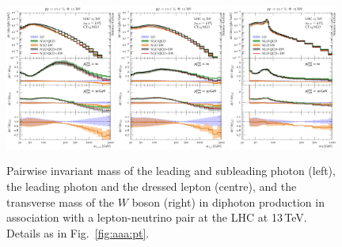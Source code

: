 \begin{figure}[t!]
  \centering
  \includegraphics[width=0.32\textwidth]{figs_aaw/m_y1y2_comb_log}
  \includegraphics[width=0.32\textwidth]{figs_aaw/m_y1l1_comb_log}
  \includegraphics[width=0.32\textwidth]{figs_aaw/m_t_comb_log}
  \caption{
    Pairwise invariant mass of the leading and subleading photon (left),
    the leading photon and the dressed lepton (centre), and the 
    transverse mass of the $W$ boson (right)
    in diphoton production in association with a lepton-neutrino 
    pair at the LHC at 13\,TeV. 
    Details as in Fig.\ \ref{fig:aaa:pt}.
    \label{fig:aaw:myy}
  }
\end{figure}

